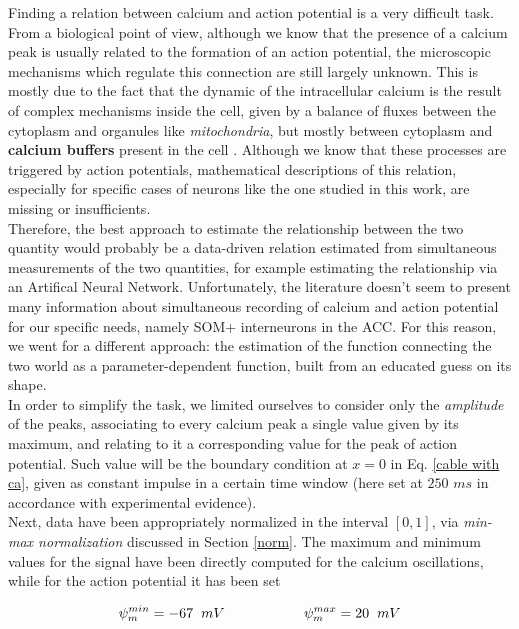 \documentclass[12pt, a4paper]{report}
\begin{document}
Finding a relation between calcium and action potential is a very difficult task. From a biological point of view, although we know that the presence of a calcium peak is usually related to the formation of an action potential, the microscopic mechanisms which regulate this connection are still largely unknown. This is mostly due to the fact that the dynamic of the intracellular calcium is the result of complex mechanisms inside the cell, given by a balance of fluxes between the cytoplasm and organules like \textit{mitochondria}, but mostly between cytoplasm and \textbf{calcium buffers} present in the cell \cite{43}. Although we know that these processes are triggered by action potentials, mathematical descriptions of this relation, especially for specific cases of neurons like the one studied in this work, are missing or insufficients.\\
Therefore, the best approach to estimate the relationship between the two quantity would probably be a data-driven relation estimated from simultaneous measurements of the two quantities, for example estimating the relationship via an Artifical Neural Network. Unfortunately, the literature doesn't seem to present many information about simultaneous recording of calcium and action potential for our specific needs, namely SOM+ interneurons in the ACC. For this reason, we went for a different approach: the estimation of the function connecting the two world as a parameter-dependent function, built from an educated guess on its shape.\\
In order to simplify the task, we limited ourselves to consider only the \textit{amplitude} of the peaks, associating to every calcium peak a single value given by its maximum, and relating to it a corresponding value for the peak of action potential. Such value will be the boundary condition at $x=0$ in Eq. \ref{cable with ca}, given as constant impulse in a certain time window (here set at $250$ $ms$ in accordance with experimental evidence).\\

Next, data have been appropriately normalized in the interval $[0,1]$, via \textit{min-max normalization} discussed in Section \ref{norm}. The maximum and minimum values for the signal have been directly computed for the calcium oscillations, while for the action potential it has been set

\begin{equation}
\psi_m ^{min}= -67 \hspace{0.2cm} mV \hspace{2cm}	\psi_m ^{max} = 20 \hspace{0.2cm} mV
\end{equation}
 
\end{document}
